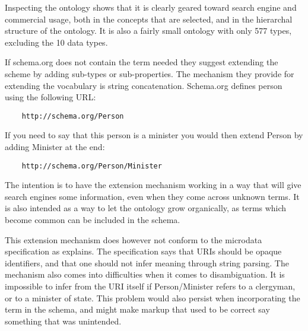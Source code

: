 
Inspecting the ontology shows that it is clearly geared toward search engine and commercial usage,
both in the concepts that are selected, and in the hierarchal structure of the ontology\citep{Ronallo2012}.
It is also a fairly small ontology with only 577 types, excluding the 10 data types.

If schema.org does not contain the term needed they suggest extending the scheme by adding sub-types or sub-properties.
The mechanism they provide for extending the vocabulary is string concatenation.
Schema.org defines person using the following URL:
\begin{verbatim}
	http://schema.org/Person
\end{verbatim}
If you need to say that this person is a minister you would then extend Person by adding Minister at the end:
\begin{verbatim}
	http://schema.org/Person/Minister
\end{verbatim}
The intention is to have the extension mechanism working in a way that will give search engines some information,
even when they come across unknown terms.
It is also intended as a way to let the ontology grow organically,
as terms which become common can be included in the schema.

This extension mechanism does however not conform to the microdata specification as \citet{Tennison2011} explains.
The specification says that URIs should be opaque identifiers,
and that one should not infer meaning through string parsing.
The mechanism also comes into difficulties when it comes to disambiguation.
It is impossible to infer from the URI itself if Person/Minister refers to a clergyman, or to a minister of state.
This problem would also persist when incorporating the term in the schema,
and might make markup that used to be correct say something that was unintended.
